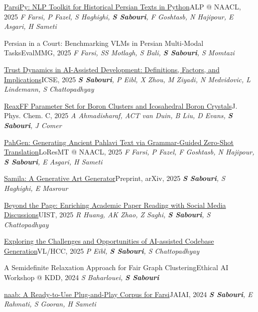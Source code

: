   \cventry
    {\href{https://aclanthology.org/2025.alp-1.17.pdf}{ParsiPy: NLP Toolkit for Historical Persian Texts in Python}}{ALP @ NAACL, 2025}
    {\textit{F Farsi, P Fazel, S Haghighi, \textbf{S Sabouri}, F Goshtasb, N Hajipour, E Asgari, H Sameti}}

  \cventry
    {Persian in a Court: Benchmarking VLMs in Persian Multi-Modal Tasks}{EvalMMG, 2025}
    {\textit{F Farsi, SS Motlagh, S Bali, \textbf{S Sabouri}, S Momtazi}}

  \cventry
    {\href{https://www.amazon.science/publications/trust-dynamics-in-ai-assisted-development-definitions-factors-and-implications}{Trust Dynamics in AI-Assisted Development: Definitions, Factors, and Implications}}{ICSE, 2025}
    {\textit{\textbf{S Sabouri}, P Eibl, X Zhou, M Ziyadi, N Medvidovic, L Lindemann, S Chattopadhyay}}

  \cventry
    {\href{https://pubs.acs.org/doi/full/10.1021/acs.jpcc.5c04822}{ReaxFF Parameter Set for Boron Clusters and Icosahedral Boron Crystals}}{J. Phys. Chem. C, 2025}
    {\textit{A Ahmadisharaf, ACT van Duin, B Liu, D Evans, \textbf{S Sabouri}, J Comer}}

  \cventry
    {\href{https://aclanthology.org/2025.loresmt-1.16.pdf}{PahGen: Generating Ancient Pahlavi Text via Grammar-Guided Zero-Shot Translation}}{LoResMT @ NAACL, 2025}
    {\textit{F Farsi, P Fazel, F Goshtasb, N Hajipour, \textbf{S Sabouri}, E Asgari, H Sameti}}

  \cventry
    {\href{https://arxiv.org/pdf/2504.04298}{Samila: A Generative Art Generator}}{Preprint, arXiv, 2025}
    {\textit{\textbf{S Sabouri}, S Haghighi, E Masrour}}

  \cventry
    {\href{https://dl.acm.org/doi/pdf/10.1145/3746059.3747647}{Beyond the Page: Enriching Academic Paper Reading with Social Media Discussions}}{UIST, 2025}
    {\textit{R Huang, AK Zhao, Z Saghi, \textbf{S Sabouri}, S Chattopadhyay}}

  \cventry
    {\href{https://arxiv.org/pdf/2508.07966}{Exploring the Challenges and Opportunities of AI-assisted Codebase Generation}}{VL/HCC, 2025}
    {\textit{P Eibl, \textbf{S Sabouri}, S Chattopadhyay}}

  \cventry
    {A Semidefinite Relaxation Approach for Fair Graph Clustering}{Ethical AI Workshop @ KDD, 2024}
    {\textit{S Baharlouei, \textbf{S Sabouri}}}

  \cventry
    {\href{https://arxiv.org/pdf/2208.13486}{naab: A Ready-to-Use Plug-and-Play Corpus for Farsi}}{JAIAI, 2024}
    {\textit{\textbf{S Sabouri}, E Rahmati, S Gooran, H Sameti}}

